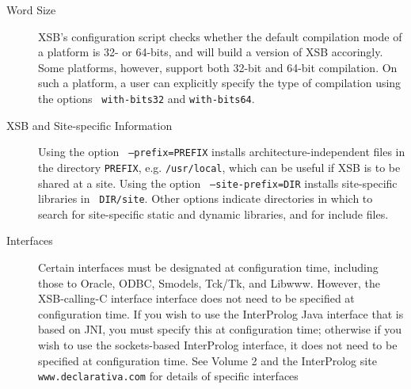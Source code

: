 \begin{description}
\item[Word Size] XSB's configuration script checks whether the default
  compilation mode of a platform is 32- or 64-bits, and will build a
  version of XSB accoringly.  Some platforms, however, support both
  32-bit and 64-bit compilation.  On such a platform, a user can
  explicitly specify the type of compilation using the options {\tt
    with-bits32} and {\tt with-bits64}.  

\item[XSB and Site-specific Information] Using the option {\tt
  --prefix=PREFIX} installs architecture-independent files in the
  directory {\tt PREFIX}, e.g. {\tt /usr/local}, which can be useful
  if XSB is to be shared at a site.  Using the option {\tt
    --site-prefix=DIR} installs site-specific libraries in {\tt
    DIR/site}.  Other options indicate directories in which to search
  for site-specific static and dynamic libraries, and for include
  files.



\item[Interfaces] Certain interfaces must be designated at
configuration time, including those to Oracle, ODBC, Smodels, Tck/Tk,
and Libwww.  However, the XSB-calling-C interface interface does not
need to be specified at configuration time.  If you wish to use the
InterProlog Java interface that is based on JNI, you must
specify this at configuration time; otherwise if you wish to use the
sockets-based InterProlog interface, it does not need to be specified
at configuration time.  See Volume 2 and the InterProlog site {\tt
www.declarativa.com} for details of specific interfaces


\end{description}

